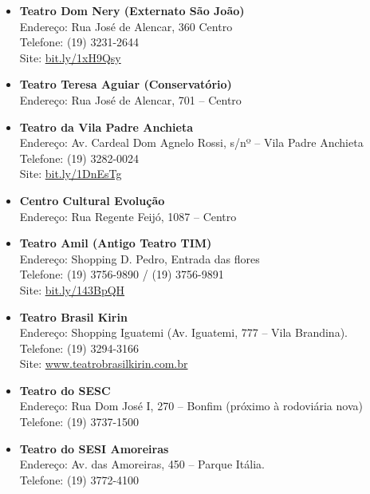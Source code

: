 \begin{itemize}
    \item   \textbf{Teatro Dom Nery (Externato São João)}
        \\Endereço: Rua José de Alencar, 360  Centro
        \\Telefone: (19) 3231-2644  %
        \\Site: \url{bit.ly/1xH9Qsy}

     \item   \textbf{Teatro Teresa Aguiar (Conservatório)}
         \\Endereço: Rua José de Alencar, 701 -- Centro

    \item   \textbf{Teatro da Vila Padre Anchieta}
        \\Endereço: Av. Cardeal Dom Agnelo Rossi, s/nº -- Vila Padre Anchieta
        \\Telefone: (19) 3282-0024
        \\Site: \url{bit.ly/1DnEsTg}

     \item   \textbf{Centro Cultural Evolução}
         \\Endereço: Rua Regente Feijó, 1087 -- Centro

    \item   \textbf{Teatro Amil (Antigo Teatro TIM)}
        \\Endereço: Shopping D. Pedro, Entrada das flores
        \\Telefone: (19) 3756-9890 / (19) 3756-9891
        \\Site: \url{bit.ly/143BpQH}

    \item   \textbf{Teatro Brasil Kirin}
		\\Endereço: Shopping Iguatemi (Av. Iguatemi, 777 -- Vila Brandina).
		\\Telefone: (19) 3294-3166
		\\Site: \url{www.teatrobrasilkirin.com.br}

    \item   \textbf{Teatro do SESC}
		\\Endereço: Rua Dom José I, 270 -- Bonfim (próximo à rodoviária nova)
		\\Telefone: (19) 3737-1500

    \item   \textbf{Teatro do SESI Amoreiras}
		\\Endereço: Av. das Amoreiras, 450 -- Parque Itália.
		\\Telefone: (19) 3772-4100


\end{itemize}
